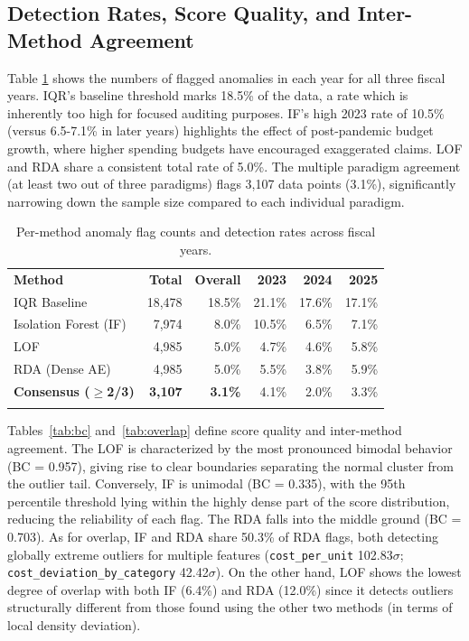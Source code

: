 \documentclass[3p,times,procedia]{elsarticle}
\begin{document}
\subsection{Detection Rates, Score Quality, and Inter-Method Agreement}

Table \ref{tab:rates} shows the numbers of flagged anomalies in each year for all three fiscal years. IQR's baseline threshold marks 18.5\% of the data, a rate which is inherently too high for focused auditing purposes. IF's high 2023 rate of 10.5\% (versus 6.5-7.1\% in later years) highlights the effect of post-pandemic budget growth, where higher spending budgets have encouraged exaggerated claims. LOF and RDA share a consistent total rate of 5.0\%. The multiple paradigm agreement (at least two out of three paradigms) flags 3,107 data points (3.1\%), significantly narrowing down the sample size compared to each individual paradigm.

\begin{table}[htb]
\caption{Per-method anomaly flag counts and detection rates across fiscal years.}
\label{tab:rates}
\begin{tabular*}{\hsize}{@{\extracolsep{\fill}}lrrrrr@{}}
\toprule
\textbf{Method} & \textbf{Total} & \textbf{Overall} & \textbf{2023} & \textbf{2024} & \textbf{2025} \\
\colrule
IQR Baseline                   & 18,478 & 18.5\% & 21.1\% & 17.6\% & 17.1\% \\
Isolation Forest (IF)          &  7,974 &  8.0\% & 10.5\% &  6.5\% &  7.1\% \\
LOF                            &  4,985 &  5.0\% &  4.7\% &  4.6\% &  5.8\% \\
RDA (Dense AE)                 &  4,985 &  5.0\% &  5.5\% &  3.8\% &  5.9\% \\
\textbf{Consensus ($\geq$2/3)} & \textbf{3,107} & \textbf{3.1\%} & 4.1\% & 2.0\% & 3.3\% \\
\botrule
\end{tabular*}
\end{table}


Tables~\ref{tab:bc} and~\ref{tab:overlap} define score quality and inter-method agreement. The LOF is characterized by the most pronounced bimodal behavior (BC = 0.957), giving rise to clear boundaries separating the normal cluster from the outlier tail. Conversely, IF is unimodal (BC = 0.335), with the 95th percentile threshold lying within the highly dense part of the score distribution, reducing the reliability of each flag. The RDA falls into the middle ground (BC = 0.703). As for overlap, IF and RDA share 50.3\% of RDA flags, both detecting globally extreme outliers for multiple features (\texttt{cost\_per\_unit}  102.83$\sigma$; \texttt{cost\_deviation\_by\_category} 42.42$\sigma$). On the other hand, LOF shows the lowest degree of overlap with both IF (6.4\%) and RDA (12.0\%) since it detects outliers structurally different from those found using the other two methods (in terms of local density deviation).
\end{document}
